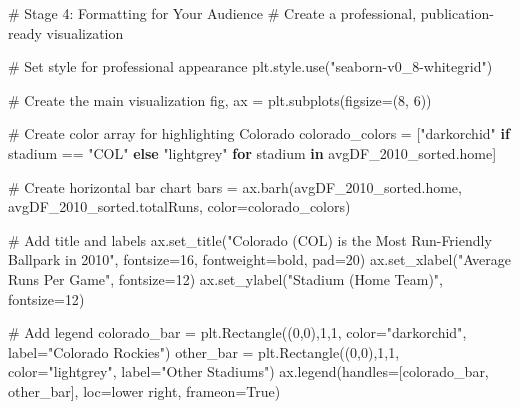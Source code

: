 \documentclass[
  letterpaper,
  DIV=11,
  numbers=noendperiod]{scrartcl}
\newenvironment{Shaded}{\begin{snugshade}}{\end{snugshade}}
\newcommand{\CommentTok}[1]{\textcolor[rgb]{0.37,0.37,0.37}{#1}}
\newcommand{\ControlFlowTok}[1]{\textcolor[rgb]{0.00,0.23,0.31}{\textbf{#1}}}
\newcommand{\DecValTok}[1]{\textcolor[rgb]{0.68,0.00,0.00}{#1}}
\newcommand{\KeywordTok}[1]{\textcolor[rgb]{0.00,0.23,0.31}{\textbf{#1}}}
\newcommand{\NormalTok}[1]{\textcolor[rgb]{0.00,0.23,0.31}{#1}}
\newcommand{\OperatorTok}[1]{\textcolor[rgb]{0.37,0.37,0.37}{#1}}
\newcommand{\StringTok}[1]{\textcolor[rgb]{0.13,0.47,0.30}{#1}}
\newcommand{\VariableTok}[1]{\textcolor[rgb]{0.07,0.07,0.07}{#1}}
\begin{document}
\begin{Shaded}
\begin{Highlighting}[]
\CommentTok{\# Stage 4: Formatting for Your Audience}
\CommentTok{\# Create a professional, publication{-}ready visualization}

\CommentTok{\# Set style for professional appearance}
\NormalTok{plt.style.use(}\StringTok{"seaborn{-}v0\_8{-}whitegrid"}\NormalTok{)}

\CommentTok{\# Create the main visualization}
\NormalTok{fig, ax }\OperatorTok{=}\NormalTok{ plt.subplots(figsize}\OperatorTok{=}\NormalTok{(}\DecValTok{8}\NormalTok{, }\DecValTok{6}\NormalTok{))}

\CommentTok{\# Create color array for highlighting Colorado}
\NormalTok{colorado\_colors }\OperatorTok{=}\NormalTok{ [}\StringTok{"darkorchid"} \ControlFlowTok{if}\NormalTok{ stadium }\OperatorTok{==} \StringTok{"COL"} \ControlFlowTok{else} \StringTok{"lightgrey"} 
                   \ControlFlowTok{for}\NormalTok{ stadium }\KeywordTok{in}\NormalTok{ avgDF\_2010\_sorted.home]}

\CommentTok{\# Create horizontal bar chart}
\NormalTok{bars }\OperatorTok{=}\NormalTok{ ax.barh(avgDF\_2010\_sorted.home, avgDF\_2010\_sorted.totalRuns, color}\OperatorTok{=}\NormalTok{colorado\_colors)}

\CommentTok{\# Add title and labels}
\NormalTok{ax.set\_title(}\StringTok{"Colorado (COL) is the Most Run{-}Friendly Ballpark in 2010"}\NormalTok{, }
\NormalTok{             fontsize}\OperatorTok{=}\DecValTok{16}\NormalTok{, fontweight}\OperatorTok{=}\StringTok{\textquotesingle{}bold\textquotesingle{}}\NormalTok{, pad}\OperatorTok{=}\DecValTok{20}\NormalTok{)}
\NormalTok{ax.set\_xlabel(}\StringTok{"Average Runs Per Game"}\NormalTok{, fontsize}\OperatorTok{=}\DecValTok{12}\NormalTok{)}
\NormalTok{ax.set\_ylabel(}\StringTok{"Stadium (Home Team)"}\NormalTok{, fontsize}\OperatorTok{=}\DecValTok{12}\NormalTok{)}

\CommentTok{\# Add legend}
\NormalTok{colorado\_bar }\OperatorTok{=}\NormalTok{ plt.Rectangle((}\DecValTok{0}\NormalTok{,}\DecValTok{0}\NormalTok{),}\DecValTok{1}\NormalTok{,}\DecValTok{1}\NormalTok{, color}\OperatorTok{=}\StringTok{"darkorchid"}\NormalTok{, label}\OperatorTok{=}\StringTok{"Colorado Rockies"}\NormalTok{)}
\NormalTok{other\_bar }\OperatorTok{=}\NormalTok{ plt.Rectangle((}\DecValTok{0}\NormalTok{,}\DecValTok{0}\NormalTok{),}\DecValTok{1}\NormalTok{,}\DecValTok{1}\NormalTok{, color}\OperatorTok{=}\StringTok{"lightgrey"}\NormalTok{, label}\OperatorTok{=}\StringTok{"Other Stadiums"}\NormalTok{)}
\NormalTok{ax.legend(handles}\OperatorTok{=}\NormalTok{[colorado\_bar, other\_bar], loc}\OperatorTok{=}\StringTok{\textquotesingle{}lower right\textquotesingle{}}\NormalTok{, frameon}\OperatorTok{=}\VariableTok{True}\NormalTok{)}


\end{Highlighting}
\end{Shaded}
\end{document}
